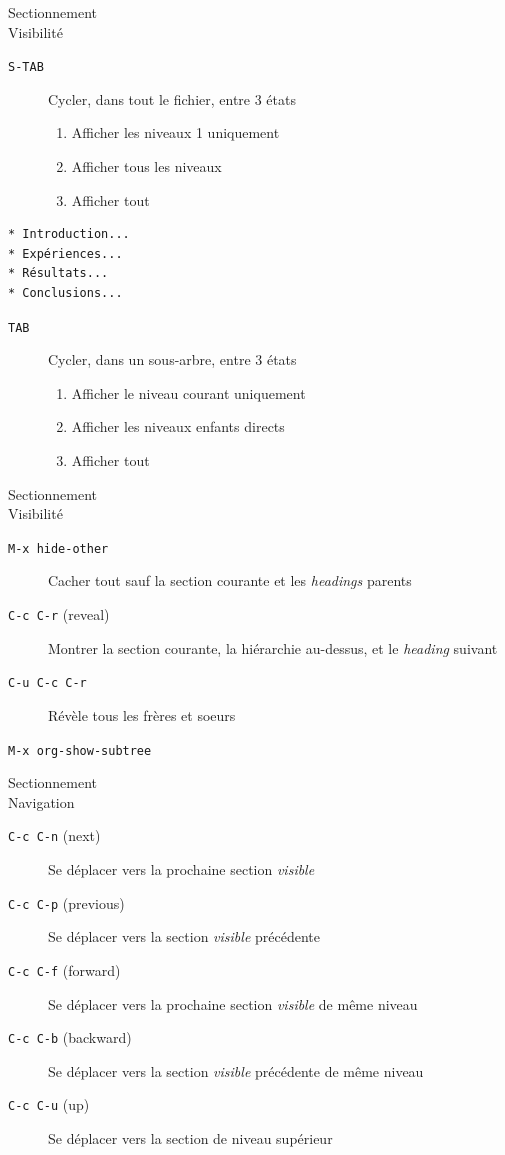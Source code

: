\documentclass[presentation,t,hideothersubsections]{beamer}
\begin{document}
\begin{frame}[fragile,label=sec-2-4-3]{Sectionnement \\ Visibilité}
 \begin{description}
\item[\texttt{S-TAB}] Cycler, dans tout le \alert{fichier}, entre 3 états
\begin{enumerate}
\item Afficher les niveaux 1 uniquement
\item Afficher tous les niveaux
\item Afficher tout
\end{enumerate}
\end{description}

\lstset{language=org,numbers=none}
\begin{lstlisting}
* Introduction...
* Expériences...
* Résultats...
* Conclusions...
\end{lstlisting}

\begin{description}
\item[\texttt{TAB}] Cycler, dans un \alert{sous-arbre}, entre 3 états
\begin{enumerate}
\item Afficher le niveau courant uniquement
\item Afficher les niveaux enfants directs
\item Afficher tout
\end{enumerate}
\end{description}
\end{frame}
\begin{frame}[fragile,label=sec-2-4-4]{Sectionnement \\ Visibilité}
 \begin{description}
\item[\texttt{M-x hide-other}] Cacher tout sauf la section courante et les \emph{headings} parents
\item[\texttt{C-c C-r} (reveal)] Montrer la section courante, la hiérarchie au-dessus, et
le \emph{heading} suivant
\item[\texttt{C-u C-c C-r}] Révèle tous les frères et soeurs
\item[\texttt{M-x org-show-subtree}]
\end{description}
\end{frame}
\begin{frame}[fragile,label=sec-2-4-5]{Sectionnement \\ Navigation}
 \begin{description}
\item[\texttt{C-c C-n} (next)] Se déplacer vers la prochaine section \emph{visible}
\item[\texttt{C-c C-p} (previous)] Se déplacer vers la section \emph{visible} précédente
\item[\texttt{C-c C-f} (forward)] Se déplacer vers la prochaine section \emph{visible} de même niveau
\item[\texttt{C-c C-b} (backward)] Se déplacer vers la section \emph{visible} précédente de même niveau
\item[\texttt{C-c C-u} (up)] Se déplacer vers la section de niveau supérieur
\end{description}
\end{frame}
\end{document}
